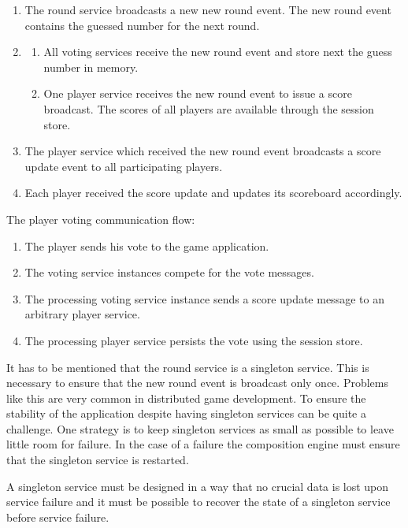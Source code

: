 \begin{enumerate}[label=\Alph*.]
  \item The round service broadcasts a new new round event. The new round event
  contains the guessed number for the next round.
  \item \begin{enumerate}[label=\arabic*.]
    \item All voting services receive the new round event and store next the
    guess number in memory.
  	\item One player service receives the new round event to issue a score
  	broadcast. The scores of all players are available through the session store.
  \end{enumerate}
  \item The player service which received the new round event broadcasts a score
  update event to all participating players.
  \item Each player received the score update and updates its scoreboard
  accordingly.
   
\end{enumerate}

The player voting communication flow:

\begin{enumerate}
  \item The player sends his vote to the game application.
  \item The voting service instances compete for the vote messages.
  \item The processing voting service instance sends a score update message to
  an arbitrary player service.
  \item The processing player service persists the vote using the session store.
\end{enumerate}

It has to be mentioned that the round service is a singleton service. This is
necessary to ensure that the new round event is broadcast only once. Problems
like this are very common in distributed game development. To ensure the
stability of the application despite having singleton services can be quite a
challenge. One strategy is to keep singleton services as small as possible to
leave little room for failure. In the case of a failure the composition engine
must ensure that the singleton service is restarted. 

A singleton service must be designed in a way that no crucial data is lost upon
service failure and it must be possible to recover the state of a singleton
service before service failure.



